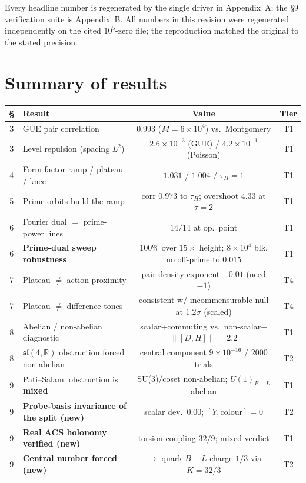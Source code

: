 \documentclass[11pt]{article}
\newcommand{\sltwo}{\mathfrak{sl}(4,\mathbb{R})}
\begin{document}
\noindent Every headline number is regenerated by the single driver in Appendix~A; the \S9 verification suite is Appendix~B. All numbers in this revision were regenerated independently on the cited $10^5$-zero file; the reproduction matched the original to the stated precision.

\section{Summary of results}

\begin{center}
\renewcommand{\arraystretch}{1.15}
\begin{longtable}{clcc}
\toprule
\S & Result & Value & Tier \\
\midrule
3 & GUE pair correlation & $0.993$ ($M{=}6{\times}10^4$) vs.\ Montgomery & T1 \\
3 & Level repulsion (spacing $L^2$) & $2.6\times10^{-3}$ (GUE) / $4.2\times10^{-1}$ (Poisson) & T1 \\
4 & Form factor ramp / plateau / knee & $1.031$ / $1.004$ / $\tau_H=1$ & T1 \\
5 & Prime orbits build the ramp & corr $0.973$ to $\tau_H$; overshoot $4.33$ at $\tau=2$ & T1 \\
6 & Fourier dual $=$ prime-power lines & $14/14$ at op.\ point & T1 \\
6 & \textbf{Prime-dual sweep robustness} & $100\%$ over $15\times$ height; $8{\times}10^4$ blk, no off-prime to $0.015$ & T1 \\
7 & Plateau $\neq$ action-proximity & pair-density exponent $-0.01$ (need $-1$) & T4 \\
7 & Plateau $\neq$ difference tones & consistent w/ incommensurable null at $1.2\sigma$ (scaled) & T4 \\
8 & Abelian / non-abelian diagnostic & scalar+commuting vs.\ non-scalar+$\|[D,H]\|{=}2.2$ & T1 \\
8 & $\sltwo$ obstruction forced non-abelian & central component $9\times10^{-16}$ / $2000$ trials & T2 \\
9 & Pati--Salam: obstruction is \textbf{mixed} & SU(3)/coset non-abelian; $U(1)_{B-L}$ abelian & T1 \\
9 & \textbf{Probe-basis invariance of the split (new)} & scalar dev.\ $0.00$; $[Y,\mathrm{colour}]=0$ & T2 \\
9 & \textbf{Real ACS holonomy verified (new)} & torsion coupling $32/9$; mixed verdict & T1 \\
9 & \textbf{Central number forced (new)} & $\to$ quark $B\!-\!L$ charge $1/3$ via $K=32/3$ & T2 \\

\end{longtable}
\end{center}
\end{document}
